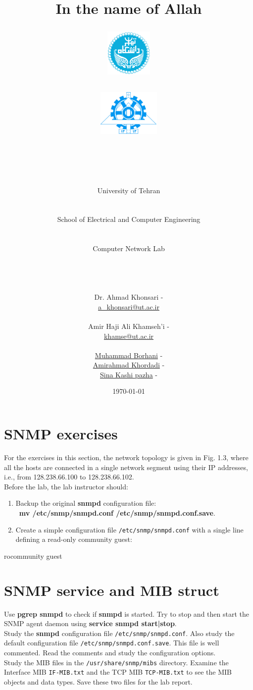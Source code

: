 \documentclass[10pt,a4paper]{article}
\title{
	\normalsize In the name of Allah\\
	\vspace{10pt}
	\LARGE\FR{بسم \allah\  الرحمن الرحیم}
	\vspace{10pt}
	\begin{center}
		\begin{minipage}{0.48\textwidth}
			\begin{flushleft}
				\includegraphics[height=64pt,width=64pt]{../img/logo.png}
			\end{flushleft}
		\end{minipage}
		\begin{minipage}{0.48\textwidth}
			\begin{flushright}
				\includegraphics[height=64pt]{../img/eng-logo.png}
			\end{flushright}
		\end{minipage}
	\end{center}
	\vspace*{-64pt}
	\huge \titleText\\
	\vspace{40pt}
}
\author{
	\huge University of Tehran\\
    \LARGE \FR{دانشگاه تهران}\\\\
    \LARGE School of Electrical and Computer Engineering\\
    \FR{دانشکده مهندسی برق و کامپیوتر}\\\\
    \Large Computer Network Lab\\
    \FR{آزمایشگاه شبکه‌های کامپیوتری}\\\\\\\\
    \normalfont
    Dr. Ahmad Khonsari - \FR{احمد خونساری}\\
    \href{mailto:a_khonsari@ut.ac.ir}{a\_khonsari@ut.ac.ir}\\\\
    \normalsize
    Amir Haji Ali Khamseh'i - \FR{امیر حاجی علی خمسه‌ء}\\
    \href{mailto:khamse@ut.ac.ir}{khamse@ut.ac.ir}\\\\
    \normalsize \href{mailto:m.borhani@ut.ac.ir}{Muhammad Borhani} - \FR{محمد برهانی}\\
	\normalsize \href{mailto:a.a.khordadi@ut.ac.ir}{Amirahmad Khordadi} - \FR{امیر احمد خردادی}\\
	\normalsize \href{mailto:sina\_kashipazha@ut.ac.ir}{Sina Kashi pazha} - \FR{سینا کاشی پزها}
}
\date{\vspace{30pt}\today\\\vspace{10pt}{\selectlanguage{farsi}\today}}
\newenvironment{grayverbatim}%
   {\snugshade\verbatim}%
   {\endverbatim\endsnugshade}
\numberwithin{equation}{section}
\numberwithin{figure}{section}
\numberwithin{table}{section}
\begin{document}
	
	\maketitle
	
	
	\pagebreak

\section*{SNMP exercises}
	For the exercises in this section, the network topology is given in Fig. 1.3, where all the hosts are connected in a single network segment using their IP addresses, i.e., from 128.238.66.100 to 128.238.66.102.\\
	Before the lab, the lab instructor should:
	\begin{enumerate}
		\item Backup the original \textbf{snmpd} configuration file:\\
		\, \textbf{mv /etc/snmp/snmpd.conf /etc/snmp/snmpd.conf.save}.
		\item Create a simple configuration file \texttt{/etc/snmp/snmpd.conf} with a single line defining a read-only community guest:
	\end{enumerate}
	\begin{grayverbatim}
		rocommunity guest
	\end{grayverbatim}

\section{SNMP service and MIB struct}
	Use \textbf{pgrep snmpd} to check if \textbf{snmpd} is started. Try to stop and then start the SNMP agent daemon using \textbf{service snmpd start|stop}.\\
	Study the \textbf{snmpd} configuration file \texttt{/etc/snmp/snmpd.conf}. Also study the default configuration file \texttt{/etc/snmp/snmpd.conf.save}. This file is well commented. Read the comments and study the configuration options.\\
	Study the MIB files in the \texttt{/usr/share/snmp/mibs} directory. Examine the Interface MIB \texttt{IF-MIB.txt} and the TCP MIB \texttt{TCP-MIB.txt} to see the MIB objects and data types. Save these two files for the lab report.
\end{document}
